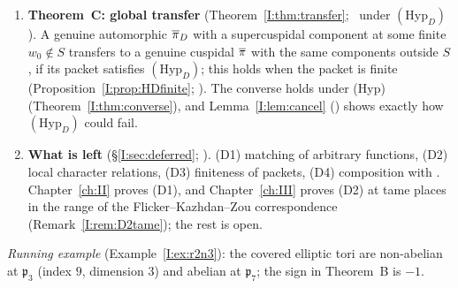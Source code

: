 \begin{enumerate}[leftmargin=*,label=\arabic*.]
\item \textbf{Theorem~C: global transfer} (Theorem~\ref{I:thm:transfer}; \Pv\ under $(\mathrm{Hyp}_D)$). A genuine automorphic $\pib_D$ with a supercuspidal component at some finite $w_0\notin S$ transfers to a genuine cuspidal $\pib$ with the same components outside $S$, if its packet satisfies $(\mathrm{Hyp}_D)$; this holds when the packet is finite (Proposition~\ref{I:prop:HDfinite}; \Pv). The converse holds under (Hyp) (Theorem~\ref{I:thm:converse}), and Lemma~\ref{I:lem:cancel} (\Pv) shows exactly how $(\mathrm{Hyp}_D)$ could fail.
\item \textbf{What is left} (\S\ref{I:sec:deferred}; \Cv). (D1) matching of arbitrary functions, (D2) local character relations, (D3) finiteness of packets, (D4) composition with \cite{JC26a}. Chapter~\ref{ch:II} proves (D1), and Chapter~\ref{ch:III} proves (D2) at tame places in the range of the Flicker--Kazhdan--Zou correspondence (Remark~\ref{I:rem:D2tame}); the rest is open.
\end{enumerate}
\emph{Running example} (Example~\ref{I:ex:r2n3}): the covered elliptic tori are non-abelian at $\mathfrak p_3$ (index $9$, dimension $3$) and abelian at $\mathfrak p_7$; the sign in Theorem~B is $-1$.
\endgroup
\begingroup
\providecommand{\ov}{}\renewcommand{\ov}[1]{\overline{#1}}
\providecommand{\A}{}\renewcommand{\A}{\mathbb{A}}
\providecommand{\C}{}\renewcommand{\C}{\mathbb{C}}
\providecommand{\Z}{}\renewcommand{\Z}{\mathbb{Z}}
\providecommand{\cO}{}\renewcommand{\cO}{\mathcal{O}}
\providecommand{\fp}{}\renewcommand{\fp}{\mathfrak{p}}
\providecommand{\gen}{}\renewcommand{\gen}{\mathrm{gen}}
\providecommand{\reg}{}\renewcommand{\reg}{\mathrm{reg}}
\providecommand{\tr}{}\renewcommand{\tr}{\operatorname{tr}}
\providecommand{\Nrd}{}\renewcommand{\Nrd}{\operatorname{Nrd}}
\providecommand{\Ad}{}\renewcommand{\Ad}{\operatorname{Ad}}
\providecommand{\Iso}{}\renewcommand{\Iso}{\operatorname{Iso}}
\providecommand{\vol}{}\renewcommand{\vol}{\operatorname{vol}}
\providecommand{\supp}{}\renewcommand{\supp}{\operatorname{supp}}
\providecommand{\Cent}{}\renewcommand{\Cent}{\operatorname{Cent}}
\providecommand{\GL}{}\renewcommand{\GL}{\mathrm{GL}}
\providecommand{\St}{}\renewcommand{\St}{\mathrm{St}}
\providecommand{\Gb}{}\renewcommand{\Gb}{\ov{G}}
\providecommand{\Zb}{}\renewcommand{\Zb}{\ov{Z}}
\providecommand{\GDb}{}\renewcommand{\GDb}{\ov{G}_D}
\providecommand{\pib}{}\renewcommand{\pib}{\ov{\pi}}
\providecommand{\Eb}{}\renewcommand{\Eb}{\ov{E}}
\providecommand{\Tb}{}\renewcommand{\Tb}{\ov{T}}
\providecommand{\cG}{}\renewcommand{\cG}{\mathcal{G}}
\providecommand{\cGb}{}\renewcommand{\cGb}{\ov{\mathcal{G}}}
\providecommand{\iD}{}\renewcommand{\iD}{\iota_D}
\providecommand{\iG}{}\renewcommand{\iG}{\iota_{\GL}}
\providecommand{\jj}{}\renewcommand{\jj}{\jmath}
\providecommand{\sg}{}\renewcommand{\sg}{\sigma}
\providecommand{\Pv}{}\renewcommand{\Pv}{\textbf{(P)}}
\providecommand{\Ev}{}\renewcommand{\Ev}{\textbf{(E)}}
\providecommand{\Ov}{}\renewcommand{\Ov}{\textbf{(O)}}
\providecommand{\Cv}{}\renewcommand{\Cv}{\textbf{(C)}}
